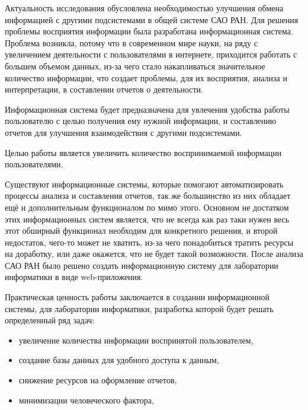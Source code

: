 Актуальность исследования обусловлена необходимостью улучшения обмена информацией с другими подсистемами в общей системе САО РАН. Для решения проблемы восприятия информации была разработана информационная система. Проблема возникла, потому что в современном мире науки, на ряду с увеличением деятельности с пользователями в интернете, приходится работать с большем объемом данных, из-за чего стало накапливаться значительное количество информации, что создает проблемы, для их восприятия, анализа и интерпретации, в составлении отчетов о деятельности. 

Информационная система будет предназначена для увлечения удобства работы пользователю с целью получения ему нужной информации, и составлению отчетов для улучшения взаимодействия с другими подсистемами.

Целью работы является увеличить количество воспринимаемой информации пользователями. 

Существуют информационные системы, которые помогают автоматизировать процессы анализа и составления отчетов, так же большинство из них обладает ещё и дополнительным функционалом по мимо этого. Основном не достатком этих информационных систем является, что не всегда как раз таки нужен весь этот обширный функционал необходим для конкретного решения, и второй недостаток, чего-то может не хватить, из-за чего понадобиться тратить ресурсы на доработку, или даже окажется, что не будет такой возможности. После анализа САО РАН было решено создать информационную систему для лаборатории информатики в виде web-приложения.

Практическая ценность работы заключается в создании информационной системы, для лаборатории информатики, разработка которой будет решать определенный ряд задач:
\begin{itemize}
	\item увеличение количества информации воспринятой пользователем,
	\item создание базы данных для удобного доступа к данным,
	\item снижение ресурсов на оформление отчетов,
	\item минимизации человеческого фактора, 
\end{itemize}



